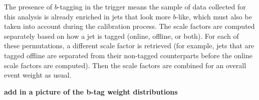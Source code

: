 The presence of $b$-tagging in the trigger means the sample of data collected for this 
analysis is already enriched in jets that look more $b$-like, which must also 
be taken into account during the calibration process.  The scale factors
are computed separately based on how a jet is tagged (online, offline, or both). 
For each of these permutations, a different scale factor is retrieved (for
example, jets that are tagged offline are separated from their non-tagged counterparts
before the online scale factors are computed).  Then the scale factors are combined
for an overall event weight as usual.  


\textbf{add in a picture of the b-tag weight distributions}













